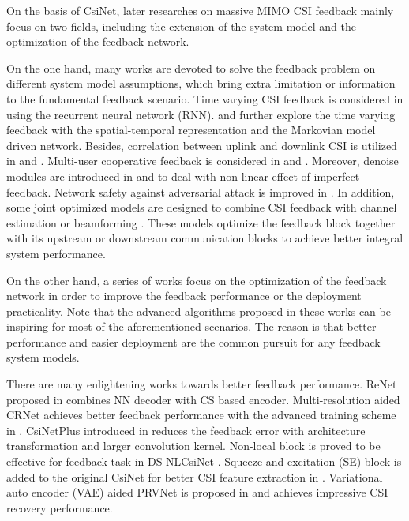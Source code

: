 \documentclass[12pt, draftclsnofoot, onecolumn]{IEEEtran}
\begin{document}
On the basis of CsiNet, later researches on massive MIMO CSI feedback mainly focus on two fields, including the extension of the system model and the optimization of the feedback network.

On the one hand, many works are devoted to solve the feedback problem on different system model assumptions, which bring extra limitation or information to the fundamental feedback scenario. Time varying CSI feedback is considered in \cite{wang2018deep} using the recurrent neural network (RNN). \cite{li2020spatio} and \cite{liu2020markovian} further explore the time varying feedback with the spatial-temporal representation and the Markovian model driven network. Besides, correlation between uplink and downlink CSI is utilized in \cite{yang2019deep} and \cite{liu2019exploiting}. Multi-user cooperative feedback is considered in \cite{mashhadi2020distributed} and \cite{guo2020dl}. Moreover, denoise modules are introduced in \cite{ye2020deep} and \cite{sun2020ancinet} to deal with non-linear effect of imperfect feedback. Network safety against adversarial attack is improved in \cite{liu2020adversarial}. In addition, some joint optimized models are designed to combine CSI feedback with channel estimation \cite{guo2021canet, mashhadi2020deep, chen2020deep} or beamforming \cite{guo2020deep,elbir2020deep,sohrabi2021deep}. These models optimize the feedback block together with its upstream or downstream communication blocks to achieve better integral system performance.

On the other hand, a series of works focus on the optimization of the feedback network in order to improve the feedback performance or the deployment practicality. Note that the advanced algorithms proposed in these works can be inspiring for most of the aforementioned scenarios. The reason is that better performance and easier deployment are the common pursuit for any feedback system models.

There are many enlightening works towards better feedback performance. ReNet proposed in \cite{liang2020deep} combines NN decoder with CS based encoder. Multi-resolution aided CRNet achieves better feedback performance with the advanced training scheme in \cite{lu2020multi}. CsiNetPlus introduced in \cite{guo2020convolutional} reduces the feedback error with architecture transformation and larger convolution kernel. Non-local block is proved to be effective for feedback task in DS-NLCsiNet \cite{yu2020ds}. Squeeze and excitation (SE) block is added to the original CsiNet for better CSI feature extraction in \cite{cai2019attention}. Variational auto encoder (VAE) aided PRVNet is proposed in \cite{hussien2020prvnet} and achieves impressive CSI recovery performance.
\end{document}
